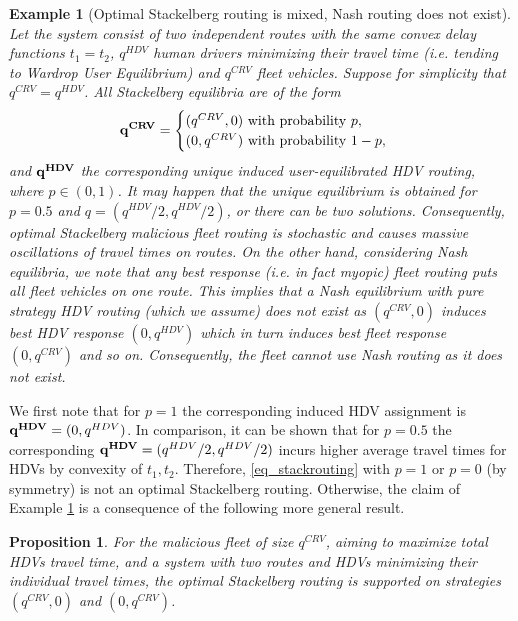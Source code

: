 \documentclass[a4paper,11pt]{article}
\newtheorem{proposition}[theorem]{Proposition}
\newtheorem{example}[theorem]{Example}
\begin{document}
\begin{example}[Optimal Stackelberg routing is mixed, Nash routing does not exist]
\label{Ex_MixedStackelberg}
Let the system consist of two independent routes with the same convex delay functions $t_1=t_2$, $q^{HDV}$ human drivers minimizing their travel time (i.e. tending to Wardrop User Equilibrium) and $q^{CRV}$ fleet vehicles. Suppose for simplicity that $q^{CRV}=q^{HDV}$. %
All Stackelberg equilibria are of the form
\begin{equation}
\label{eq_stackrouting}
\bold{q^{CRV}} = 
\begin{cases}
(q^{CRV}, 0) \mbox{ with probability } p, \\
(0, q^{CRV}) \mbox{ with probability } 1-p,
\end{cases}
\end{equation}
and $\bold{q^{HDV}}$ the corresponding unique induced user-equilibrated HDV routing, where $p \in (0,1)$. It may happen that the unique equilibrium is obtained for $p=0.5$
and $q = (q^{HDV}/2,q^{HDV}/2)$, or there can be two solutions. Consequently, optimal Stackelberg malicious fleet routing is stochastic and causes massive oscillations of travel times on routes. On the other hand, considering Nash equilibria, we note that any best response (i.e. in fact myopic) fleet routing puts all fleet vehicles on one route. This implies that a Nash equilibrium with pure strategy HDV routing (which we assume) does not exist as $(q^{CRV},0)$ induces best HDV response $(0,q^{HDV})$ which in turn induces best fleet response $(0,q^{CRV})$ and so on. Consequently, the fleet cannot use Nash routing as it does not exist.     
\end{example}
\noindent We first note that for $p=1$ the corresponding induced HDV assignment is $\bold{q^{HDV}} = (0,q^{HDV})$. In comparison, it can be shown that for $p=0.5$ the corresponding $\bold{q^{HDV}} = (q^{HDV}/2,q^{HDV}/2)$ incurs higher average travel times for HDVs by convexity of $t_1,t_2$. Therefore, \eqref{eq_stackrouting} with $p=1$ or $p=0$ (by symmetry) is not an optimal Stackelberg routing. Otherwise, the claim of Example \ref{Ex_MixedStackelberg} is a consequence of the following more general result.  
\begin{proposition}
\label{Prop_boundary}
For the malicious fleet of size $q^{CRV}$, aiming to maximize total HDVs travel time, and a system with two routes and HDVs minimizing their individual travel times, the optimal Stackelberg routing is supported on strategies $(q^{CRV},0)$ and $(0,q^{CRV})$.
\end{proposition}
\end{document}
